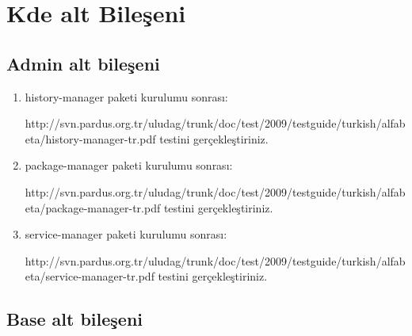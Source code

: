 \documentclass[a4paper,10pt]{article}
\begin{document}
\section{Kde alt Bileşeni}
\subsection*{Admin alt bileşeni}

\begin{enumerate} 
 \item history-manager paketi kurulumu sonrası:

 http://svn.pardus.org.tr/uludag/trunk/doc/test/2009/testguide/turkish/alfabeta/history-manager-tr.pdf  testini gerçekleştiriniz.

\item package-manager paketi kurulumu sonrası:

http://svn.pardus.org.tr/uludag/trunk/doc/test/2009/testguide/turkish/alfabeta/package-manager-tr.pdf  testini gerçekleştiriniz.

\item service-manager paketi kurulumu sonrası:

http://svn.pardus.org.tr/uludag/trunk/doc/test/2009/testguide/turkish/alfabeta/service-manager-tr.pdf  testini gerçekleştiriniz.

\end{enumerate}

\subsection*{Base alt bileşeni}
\end{document}
